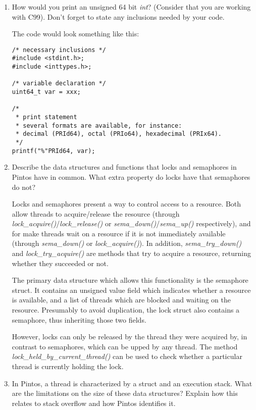 \documentclass[11pt]{article}
\begin{document}
\begin{enumerate}
\item How would you print an unsigned 64 bit \emph{int}?
(Consider that you are working with C99). Don't forget to state any inclusions
needed by your code.

The code would look something like this:

\begin{verbatim}
/* necessary inclusions */
#include <stdint.h>;
#include <inttypes.h>;

/* variable declaration */
uint64_t var = xxx;

/*
 * print statement
 * several formats are available, for instance:
 * decimal (PRId64), octal (PRIo64), hexadecimal (PRIx64).
 */
printf("%"PRId64, var);
\end{verbatim}

\item Describe the data structures and functions that locks and semaphores in
Pintos have in common. What extra property do locks have that semaphores do not?

Locks and semaphores present a way to control access to a resource. Both allow
threads to acquire/release the resource (through
\emph{lock\_acquire()}/\emph{lock\_release()} or
\emph{sema\_down()}/\emph{sema\_up()} respectively), and for make threads wait
on a resource if it is not immediately available (through \emph{sema\_down()} or
\emph{lock\_acquire()}). In addition, \emph{sema\_try\_down()} and
\emph{lock\_try\_acquire()} are methods that try to acquire a resource,
returning whether they succeeded or not.

The primary data structure which allows this functionality is the semaphore
struct. It contains an unsigned value field which indicates whether a resource
is available, and a list of threads which are blocked and waiting on the
resource. Presumably to avoid duplication, the lock struct also contains a
semaphore, thus inheriting those two fields.

However, locks can only be released by the thread they were acquired by, in
contrast to semaphores, which can be upped by any thread. The method
\emph{lock\_held\_by\_current\_thread()} can be used to check whether a
particular thread is currently holding the lock.

\item In Pintos, a thread is characterized by a struct and an execution stack.
What are the limitations on the size of these data structures? Explain how this
relates to stack overflow and how Pintos identifies it.


\end{enumerate}
\end{document}
